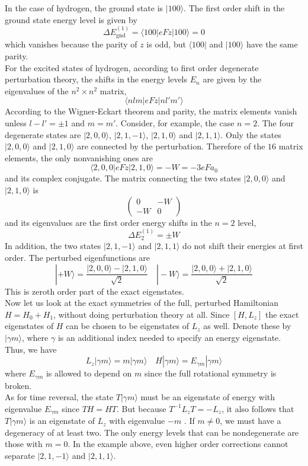 In the case of hydrogen, the ground state is $|100\rangle$. The first order shift in the ground state energy level is given by
\[\Delta E^{(1)}_{\mathrm{gnd}} = \langle 100 | eFz | 100\rangle = 0\]
which vanishes because the parity of $z$ is odd, but $\langle 100 |$ and $| 100\rangle$ have the same parity.\\
For the excited states of hydrogen, according to first order degenerate perturbation theory, the shifts in the energy levels $E_n$ are given by the eigenvalues of the $n^2\times n^2$ matrix,
\[\langle nlm | eFz | nl'm'\rangle\]
According to the Wigner-Eckart theorem and parity, the matrix elements vanish unless $l -l' = \pm 1$ and $m = m'$. Consider, for example, the case $n=2$. The four degenerate states are  $|2,0,0\rangle$, $|2,1,-1\rangle$, $|2,1,0\rangle$ and $|2,1,1\rangle$. Only the states $|2,0,0\rangle$ and $|2,1,0\rangle$ are connected by the perturbation. Therefore of the $16$ matrix elements, the only nonvanishing ones are
\[\langle 2,0,0 | eFz | 2,1,0\rangle = -W = -3eFa_0\]
and its complex conjugate. The matrix connecting the two states $|2,0,0\rangle$ and $|2,1,0\rangle$ is
\[\begin{pmatrix}0 & -W \\ -W & 0\end{pmatrix} \]
and its eigenvalues are the first order energy shifts in the $n=2$ level,
\[\Delta E_2^{(1)} = \pm W\]
In addition, the two states $|2,1,-1\rangle$ and $|2,1,1\rangle$ do not shift their energies at first order. The perturbed eigenfunctions are
\[|+W\rangle = \frac{|2,0,0\rangle - |2,1,0\rangle}{\sqrt{2}} \quad |-W\rangle = \frac{|2,0,0\rangle + |2,1,0\rangle}{\sqrt{2}}\]
This is zeroth order part of the exact eigenstates.\\
Now let us look at the exact symmetries of the full, perturbed Hamiltonian $ H = H_0 + H_1$, without doing perturbation theory at all. Since $[H,L_z]$ the exact eigenstates of $H$ can be chosen to be eigenstates of $L_z$ as well.
Denote these by $|\gamma m \rangle$, where $\gamma$ is an additional index needed to specify an energy
eigenstate. Thus, we have
\[L_z |\gamma m \rangle = m |\gamma m \rangle \quad H |\gamma m \rangle = E_{\gamma m} |\gamma m \rangle\]
where $E_{\gamma m}$ is allowed to depend on $m$ since the full rotational symmetry is broken. \\
As for time reversal, the state $T|\gamma m\rangle$ must be an eigenstate of energy with eigenvalue $E_{\gamma m}$ since $TH = HT$. But because $T^{-1}L_zT = -L_z$, it also follows that $T|\gamma m\rangle$ is an eigenstate of $L_z$ with eigenvalue $-m$ . If $m \neq 0$, we must have a degeneracy of at least two. 
The only energy levels that can be nondegenerate are those with $m=0$. In the example above, even higher order corrections cannot separate $|2,1,-1\rangle$ and $|2,1,1\rangle$.

